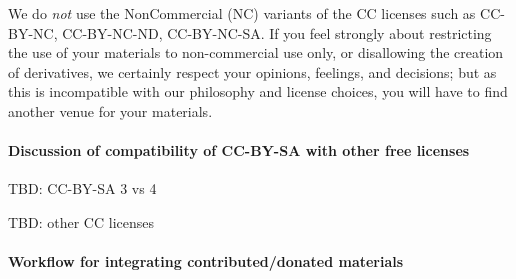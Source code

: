 We do \emph{not} use the NonCommercial (NC) variants of the CC licenses
such as CC-BY-NC, CC-BY-NC-ND, CC-BY-NC-SA. If you feel strongly about
restricting the use of your materials to non-commercial use only, or
disallowing the creation of derivatives, we certainly respect your
opinions, feelings, and decisions; but as this is incompatible with our
philosophy and license choices, you will have to find another venue for
your materials.

\hypertarget{discussion-of-compatibility-of-cc-by-sa-with-other-free-licenses}{%
\paragraph{Discussion of compatibility of CC-BY-SA with other free
licenses}\label{discussion-of-compatibility-of-cc-by-sa-with-other-free-licenses}}

TBD: CC-BY-SA 3 vs 4

TBD: other CC licenses

\hypertarget{workflow-for-integrating-contributeddonated-materials}{%
\paragraph{Workflow for integrating contributed/donated
materials}\label{workflow-for-integrating-contributeddonated-materials}}

